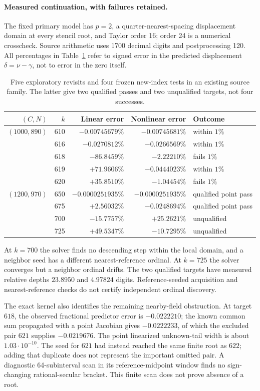 \paragraph{Measured continuation, with failures retained.}
The fixed primary model has $p=2$, a quarter-nearest-spacing displacement
domain at every stencil root, and Taylor order 16; order 24 is a numerical
crosscheck. Source arithmetic uses 1700 decimal digits and postprocessing
120. All percentages in Table~\ref{tab:nonlinear-edge} refer to signed
error in the predicted displacement $\delta=\nu-\gamma$, not to error
in the zero itself.
\begin{table}[htbp]
\centering\small
\begin{tabular}{rrrrl}
\toprule
$(C,N)$ & $k$ & Linear error & Nonlinear error & Outcome\\
\midrule
$(1000,890)$ &610&$-0.00745679\%$&$-0.00745681\%$&within $1\%$\\
 &616&$-0.0270812\%$&$-0.0266569\%$&within $1\%$\\
 &618&$-86.8459\%$&$-2.22210\%$&fails $1\%$\\
 &619&$+71.9606\%$&$-0.0444023\%$&within $1\%$\\
 &620&$+35.8510\%$&$-1.04454\%$&fails $1\%$\\
\midrule
$(1200,970)$ &650&$-0.0000251935\%$&$-0.0000251935\%$&qualified point pass\\
 &675&$+2.56032\%$&$-0.0248694\%$&qualified point pass\\
 &700&$-15.7757\%$&$+25.2621\%$&unqualified\\
 &725&$+49.5347\%$&$-10.7295\%$&unqualified\\
\bottomrule
\end{tabular}
\caption{Five exploratory revisits and four frozen new-index tests in an
existing source family. The latter give two qualified passes and two
unqualified targets, not four successes.}
\label{tab:nonlinear-edge}
\end{table}
At $k=700$ the solver finds no descending step within the local domain,
and a neighbor seed has a different nearest-reference ordinal. At $k=725$
the solver converges but a neighbor ordinal drifts. The two qualified
targets have measured relative depths $23.8950$ and $4.97824$ digits.
Reference-seeded acquisition and nearest-reference checks do not certify
independent ordinal discovery.

The exact kernel also identifies the remaining nearby-field obstruction.
At target $618$, the observed fractional predictor error is $-0.0222210$;
the known common sum propagated with a point Jacobian gives $-0.0222233$,
of which the excluded pair $621$ supplies $-0.0219676$. The point
linearized unknown-tail width is about $1.03\cdot10^{-10}$. The seed for
$621$ had instead reached the same finite root as $622$; adding that
duplicate does not represent the important omitted pair. A diagnostic
64-subinterval scan in its reference-midpoint window finds no
sign-changing rational-secular bracket. This finite scan does not prove
absence of a root.

